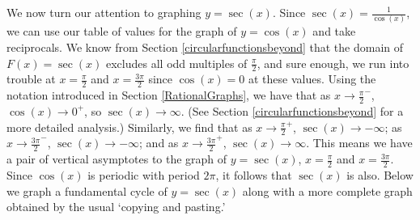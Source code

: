 We now turn our attention to graphing $y = \sec(x)$.  Since $\sec(x) = \frac{1}{\cos(x)}$, we can use our table of values for the graph of $y = \cos(x)$ and take reciprocals. We know from Section \ref{circularfunctionsbeyond} that the domain of $F(x) = \sec(x)$ excludes all odd multiples of $\frac{\pi}{2}$, and sure enough, we run into trouble at $x = \frac{\pi}{2}$ and $x = \frac{3\pi}{2}$ since $\cos(x) = 0$ at these values.  Using the notation introduced in Section \ref{RationalGraphs}, we have that as $x \rightarrow \frac{\pi}{2}^{-}$, $\cos(x) \rightarrow 0^{+}$, so $\sec(x) \rightarrow \infty$. (See Section \ref{circularfunctionsbeyond} for a more detailed analysis.) Similarly, we find that  as $x \rightarrow \frac{\pi}{2}^{+}$, $\sec(x) \rightarrow -\infty$;  as $x \rightarrow \frac{3\pi}{2}^{-}$, $\sec(x) \rightarrow -\infty$; and as $x \rightarrow \frac{3\pi}{2}^{+}$, $\sec(x) \rightarrow \infty$.  This means we have a pair of vertical asymptotes to the graph of $y = \sec(x)$, $x = \frac{\pi}{2}$ and $x = \frac{3\pi}{2}$.  Since $\cos(x)$ is periodic with period $2\pi$, it follows that $\sec(x)$ is also.  Below we graph a fundamental cycle of $y = \sec(x)$  along with a more complete graph obtained by the usual `copying and pasting.' 


\medskip

